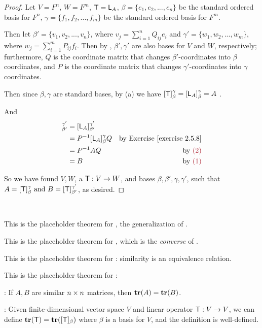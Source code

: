 \begin{proof}
Let \(V = F^n\), \(W = F^m\), \(\textsf{T} = \textsf{L}_A\), \(\beta = \{ e_1, e_2, ..., e_n \}\) be the standard ordered basis for \(F^n\), \(\gamma = \{ f_1, f_2, ..., f_m \}\) be the standard ordered basis for \(F^m\).

Then let \(\beta' = \{ v_1, v_2, ..., v_n \}\), where \(v_j = \sum_{i = 1}^n Q_{ij} e_i\) and \(\gamma' = \{ w_1, w_2, ..., w_m \}\), where \(w_j = \sum_{i = 1}^m P_{ij} f_i\).
Then by , \(\beta', \gamma'\) are also bases for \(V\) and \(W\), respectively;
furthermore, \(Q\) is the coordinate matrix that changes \(\beta'\)-coordinates into \(\beta\) coordinates,
and \(P\) is the coordinate matrix that changes \(\gamma'\)-coordinates into \(\gamma\) coordinates.

Then since \(\beta, \gamma\) are standard bases, by (a) we have \([\textsf{T}]_{\beta}^{\gamma} = [\textsf{L}_A]_{\beta}^{\gamma} = A\) .

And
\begin{align*}
    [\T]_{\beta'}^{\gamma'}
        & = [\LMTRAN_A]_{\beta'}^{\gamma'} \\
        & = P^{-1} [\LMTRAN_A]_{\beta}^{\gamma} Q & \text{by \EXEC{2.5.8}} \\
        & = P^{-1} A Q & \text{by \MAROON{(2)}} \\
        & = B & \text{by \MAROON{(1)}}
\end{align*}

So we have found \(V, W\), a \LTRAN{} \(\textsf{T} : V \to W\), and bases \(\beta, \beta', \gamma, \gamma'\), such that \(A = [\textsf{T}]_{\beta}^{\gamma} \text{ and } B = [\textsf{T}]_{\beta'}^{\gamma'}\), as desired.
\end{proof}

\begin{additional theorem} \label{athm 2.46} \ 

 This is the placeholder theorem for , the generalization of .

 This is the placeholder theorem for , which is the \emph{converse} of .
\end{additional theorem}

\begin{additional theorem} \label{athm 2.47}
This is the placeholder theorem for : similarity is an equivalence relation.
\end{additional theorem}

\begin{additional theorem} \label{athm 2.48}
This is the placeholder theorem for :

: If \(A, B\) are similar \(n \times n\) matrices, then \(\textbf{tr}(A) = \textbf{tr}(B)\).

: Given finite-dimensional vector space \(V\) and linear operator \(\textsf{T} : V \to V\), we can define \(\textbf{tr}(\textsf{T}) = \textbf{tr}([\textsf{T}]_{\beta})\) where \(\beta\) is a basis for \(V\), and the definition is well-defined.
\end{additional theorem}

